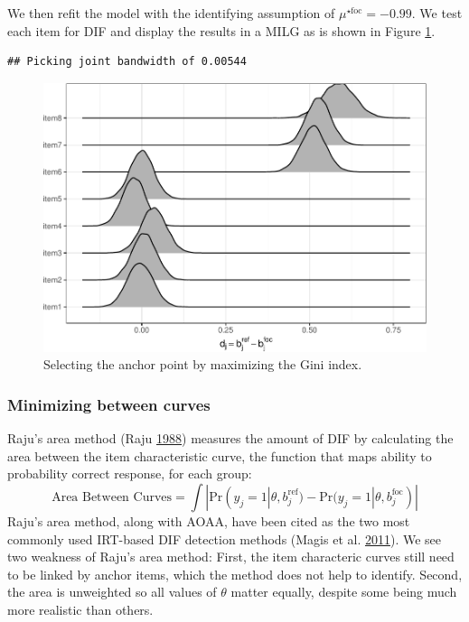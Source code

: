 \documentclass[
  11pt,
]{article}
\begin{document}
We then refit the model with the identifying assumption of \(\mu^{\star\text{foc}} = -0.99\). We test each item for DIF and display the results in a MILG as is shown in Figure \ref{fig:ginimilg}.

\begin{verbatim}
## Picking joint bandwidth of 0.00544
\end{verbatim}

\begin{figure}[H]

{\centering \includegraphics[width=0.7\linewidth]{paper_files/figure-latex/ginimilg-1} 

}

\caption{Selecting the anchor point by maximizing the Gini index.}\label{fig:ginimilg}
\end{figure}

\hypertarget{minimizing-between-curves}{%
\subsubsection{Minimizing between curves}\label{minimizing-between-curves}}

Raju's area method (Raju \protect\hyperlink{ref-raju1988area}{1988}) measures the amount of DIF by calculating the area between the item characteristic curve, the function that maps ability to probability correct response, for each group:
\[
\text{Area Between Curves} = \int |\text{Pr}(y_j = 1| \theta, b_j^{\text{ref}}) - \text{Pr}(y_j = 1| \theta, b_j^{\text{foc}})|
\]
Raju's area method, along with AOAA, have been cited as the two most commonly used IRT-based DIF detection methods (Magis et al. \protect\hyperlink{ref-magis2011generalized}{2011}). We see two weakness of Raju's area method: First, the item characteric curves still need to be linked by anchor items, which the method does not help to identify. Second, the area is unweighted so all values of \(\theta\) matter equally, despite some being much more realistic than others.
\end{document}
